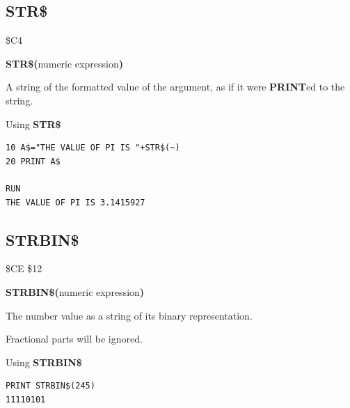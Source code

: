 \subsection{STR\$}
\begin{description}[leftmargin=2cm,style=nextline]
\item [Token:]    \$C4

\item [Format:]   {\bf STR\$(}numeric expression{\bf)}

\item [Returns:]  A string of the formatted value of the argument, as if it were {\bf PRINT}ed to the string.

\item [Example:]  Using {\bf STR\$}

\begin{tcolorbox}[colback=black,coltext=white]
\verbatimfont{\codefont}
\begin{verbatim}
10 A$="THE VALUE OF PI IS "+STR$(~)
20 PRINT A$

RUN
THE VALUE OF PI IS 3.1415927
\end{verbatim}
\end{tcolorbox}
\end{description}


\newpage
\subsection{STRBIN\$}
\begin{description}[leftmargin=2cm,style=nextline]
\item [Token:]    \$CE \$12

\item [Format:]   {\bf STRBIN\$(}numeric expression{\bf)}

\item [Returns:]  The number value as a string of its binary representation.

\item [Remarks:]  Fractional parts will be ignored.

\item [Example:]  Using {\bf STRBIN\$}

\begin{tcolorbox}[colback=black,coltext=white]
\verbatimfont{\codefont}
\begin{verbatim}
PRINT STRBIN$(245)
11110101
\end{verbatim}
\end{tcolorbox}
\end{description}

